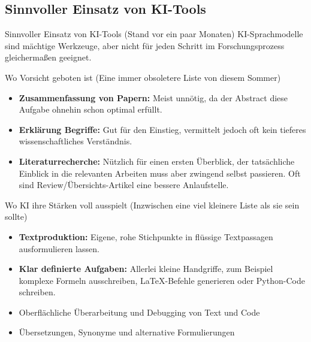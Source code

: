 \documentclass[aspectratio=\BeamerAspectRatio]{beamer}
\begin{document}
\subsection{Sinnvoller Einsatz von KI-Tools}
\begin{frame}[fragile]{Sinnvoller Einsatz von KI-Tools (Stand vor ein paar Monaten)}
    \footnotesize
    KI-Sprachmodelle sind mächtige Werkzeuge, aber nicht für jeden Schritt im Forschungsprozess gleichermaßen geeignet.

    \vspace{0.5em}
    \begin{myalert}{Wo Vorsicht geboten ist (Eine immer obsoletere Liste von diesem Sommer)}
        \begin{itemize}
            \item \textbf{Zusammenfassung von Papern:} Meist unnötig, da der Abstract diese Aufgabe ohnehin schon optimal erfüllt.
            \item \textbf{Erklärung  Begriffe:} Gut für den Einstieg, vermittelt jedoch oft kein tieferes wissenschaftliches Verständnis.
            \item \textbf{Literaturrecherche:} Nützlich für einen ersten Überblick, der tatsächliche Einblick in die relevanten Arbeiten muss aber zwingend selbst passieren. Oft sind Review/Übersichts-Artikel eine bessere Anlaufstelle. 
        \end{itemize}
    \end{myalert}

    \begin{mynote}{Wo KI ihre Stärken voll ausspielt (Inzwischen eine viel kleinere Liste als sie sein sollte)}
        \begin{itemize}
            \item \textbf{Textproduktion:} Eigene, rohe Stichpunkte in flüssige Textpassagen ausformulieren lassen.
            \item \textbf{Klar definierte Aufgaben:} Allerlei kleine Handgriffe, zum Beispiel komplexe Formeln ausschreiben, \LaTeX-Befehle generieren oder Python-Code schreiben.
            \item Oberflächliche Überarbeitung und Debugging von Text und Code
            \item Übersetzungen, Synonyme und alternative Formulierungen 
        \end{itemize}
    \end{mynote}
\end{frame}
\end{document}
